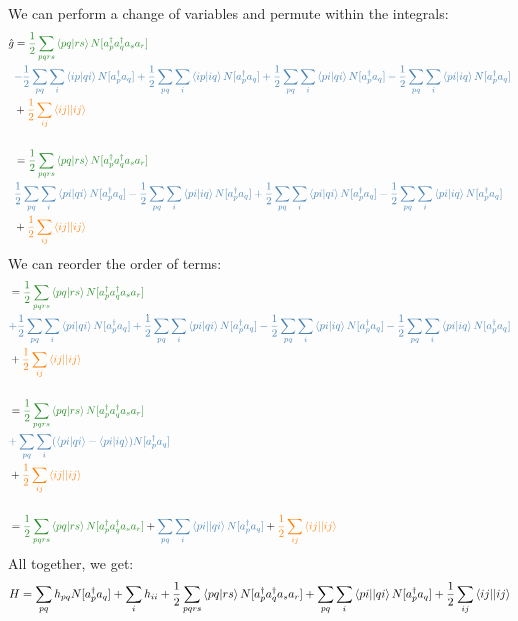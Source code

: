 \documentclass{article}
\newcommand{\dg}{\ensuremath{^\dagger} }
\def\cb#1{{\color{blue}#1}}
\def\co#1{{\color{orange}#1}}
\def\cg#1{{\color{green}#1}}
\begin{document}
We can perform a change of variables and permute within the integrals: 
\begin{align*}
\hat{g}&= \cg{\frac{1}{2} \sum_{pqrs} \braket{pq | rs} N[a_p\dg a_q\dg a_s a_r] } \\
& \cb{- \frac{1}{2} \sum_{pq} \sum_i \braket{ip | qi} N[ a_p\dg a_q] +  
\frac{1}{2} \sum_{pq} \sum_i \braket{ip | iq} N[ a_p\dg a_q ] + 
\frac{1}{2} \sum_{pq} \sum_i \braket{pi | qi} N[ a_p\dg a_q] -
\frac{1}{2} \sum_{pq} \sum_i \braket{pi | iq} N[ a_p\dg a_q] } \\
&+ \co{ \frac{1}{2} \sum_{ij} \braket{ij || ij} } \\ \\
&= \cg{\frac{1}{2} \sum_{pqrs} \braket{pq | rs} N[a_p\dg a_q\dg a_s a_r] } \\
& \cb{ \frac{1}{2} \sum_{pq} \sum_i \braket{pi | qi} N[ a_p\dg a_q] -
\frac{1}{2} \sum_{pq} \sum_i \braket{pi | iq} N[ a_p\dg a_q ] + 
\frac{1}{2} \sum_{pq} \sum_i \braket{pi | qi} N[ a_p\dg a_q] -
\frac{1}{2} \sum_{pq} \sum_i \braket{pi | iq} N[ a_p\dg a_q] } \\
&+ \co{ \frac{1}{2} \sum_{ij} \braket{ij || ij} } 
\end{align*}
We can reorder the order of terms:
\begin{align*}
&= \cg{\frac{1}{2} \sum_{pqrs} \braket{pq | rs} N[a_p\dg a_q\dg a_s a_r] } \\
& \cb{+ \frac{1}{2} \sum_{pq} \sum_i \braket{pi | qi} N[ a_p\dg a_q] +  
\frac{1}{2} \sum_{pq} \sum_i \braket{pi | qi} N[ a_p\dg a_q ] - 
\frac{1}{2} \sum_{pq} \sum_i \braket{pi | iq} N[ a_p\dg a_q] -
\frac{1}{2} \sum_{pq} \sum_i \braket{pi | iq} N[ a_p\dg a_q] } \\
&+ \co{ \frac{1}{2} \sum_{ij} \braket{ij || ij} }\\ \\
&= \cg{\frac{1}{2} \sum_{pqrs} \braket{pq | rs} N[a_p\dg a_q\dg a_s a_r] } \\
& \cb{+ \sum_{pq} \sum_i ( \braket{pi | qi} - \braket{pi | iq})  N[ a_p\dg a_q]} \\
&+ \co{ \frac{1}{2} \sum_{ij} \braket{ij || ij} } \\ \\
&=  \cg{\frac{1}{2} \sum_{pqrs} \braket{pq | rs} N[a_p\dg a_q\dg a_s a_r] } +  \cb{ \sum_{pq} \sum_i \braket{pi || qi}   N[ a_p\dg a_q]} + \co{ \frac{1}{2} \sum_{ij} \braket{ij || ij} } 
\end{align*}
All together, we get: 
\[H = \sum_{pq}h_{pq} N[a_p\dg a_q] + \sum_{i}h_{ii} + \frac{1}{2} \sum_{pqrs} \braket{pq | rs} N[a_p\dg a_q\dg a_s a_r]  +   \sum_{pq} \sum_i \braket{pi || qi}   N[ a_p\dg a_q] +  \frac{1}{2} \sum_{ij} \braket{ij || ij}  \]
\end{document}
